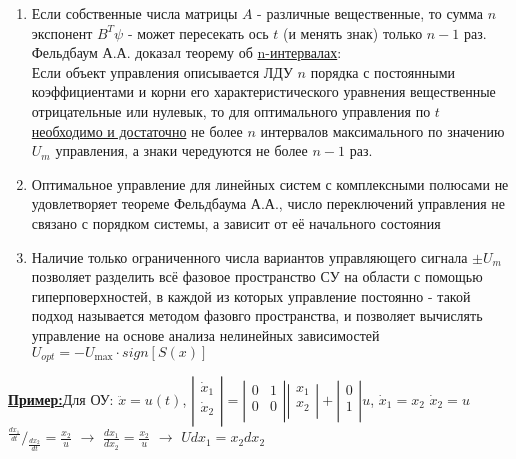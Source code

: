 \documentclass[preprint,russian,a5paper,10pt,twoside,mediummath]{ncc}
\newcommand{\ExampleMy}{\vspace{\baselineskip}\textbf{\underline{Пример:}}}
\begin{document}
\begin{enumerate}
\item Если собственные числа матрицы $A$ - различные вещественные, то сумма $n$ экспонент ${{B}^{T}}\psi $ - может пересекать ось $t$ (и менять знак) только $n-1$ раз.   Фельдбаум А.А. доказал теорему об \underline{n-интервалах}:
\\Если объект управления описывается ЛДУ $n$ порядка с постоянными коэффициентами и корни его характеристического уравнения вещественные отрицательные или нулевык, то для оптимального управления по $t$ \underline{необходимо и достаточно} не более $n$ интервалов максимального по значению ${{U}_{m}}$ управления, а знаки чередуются не более $n-1$ раз.
\item Оптимальное управление для линейных систем с комплексными полюсами не удовлетворяет теореме Фельдбаума А.А., число переключений управления не связано с порядком системы, а зависит от её начального состояния
\item Наличие только ограниченного числа вариантов управляющего сигнала $\pm {{U}_{m}}$ позволяет разделить всё фазовое пространство СУ на области с помощью гиперповерхностей, в каждой из которых управление постоянно - такой подход называется методом фазовго пространства, и позволяет вычислять управление на основе анализа нелинейных зависимостей   ${{U}_{opt}}=-{{U}_{\max }}\cdot sign\left[ S\left( x \right) \right]$
\end{enumerate}
\ExampleMy Для ОУ: $\ddot{x}=u\left( t \right)$, $\left| \begin{matrix}
   {{{\dot{x}}}_{1}}  \\
   {{{\dot{x}}}_{2}}  \\
\end{matrix} \right|=\left| \begin{matrix}
   0 & 1  \\
   0 & 0  \\
\end{matrix} \right|\left| \begin{matrix}
   {{x}_{1}}  \\
   {{x}_{2}}  \\
\end{matrix} \right|+\left| \begin{matrix}
   0  \\
   1  \\
\end{matrix} \right|u$, ${{\dot{x}}_{1}}={{x}_{2}}$ ${{\dot{x}}_{2}}=u$
\\${}^{\frac{d{{x}_{1}}}{dt}}/{}_{\frac{d{{x}_{2}}}{dt}}=\frac{{{x}_{2}}}{u}$ $\to $ $\frac{d{{x}_{1}}}{d{{x}_{2}}}=\frac{{{x}_{2}}}{u}$ $\to $ $Ud{{x}_{1}}={{x}_{2}}d{{x}_{2}}$
\end{document}
